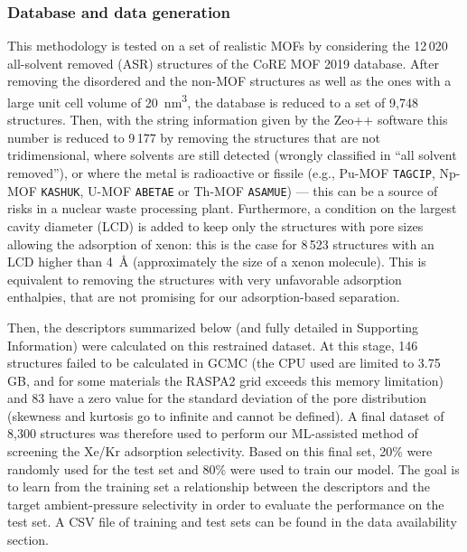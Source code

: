 \documentclass[main]{subfiles}
\begin{document}
\subsubsection{Database and data generation}

This methodology is tested on a set of realistic MOFs by considering the 12\,020 all-solvent removed (ASR) structures of the CoRE MOF 2019 database\autocite{Chung_2019}. After removing the disordered and the non-MOF structures as well as the ones with a large unit cell volume of \SI{20}{\cubic\nano\meter}, the database is reduced to a set of 9,748 structures. Then, with the string information given by the Zeo++ software\autocite{zeopp_Willems2012} this number is reduced to 9\,177 by removing the structures that are not tridimensional, where solvents are still detected (wrongly classified in ``all solvent removed''), or where the metal is radioactive or fissile (e.g., Pu-MOF \texttt{TAGCIP}\autocite{Diwu_2010}, Np-MOF \texttt{KASHUK}\autocite{Martin_2017}, U-MOF \texttt{ABETAE}\autocite{Jouffret_2011} or Th-MOF \texttt{ASAMUE}\autocite{Liang_2016}) --- this can be a source of risks in a nuclear waste processing plant. Furthermore, a condition on the largest cavity diameter (LCD) is added to keep only the structures with pore sizes allowing the adsorption of xenon: this is the case for 8\,523 structures with an LCD higher than \SI{4}{\angstrom} (approximately the size of a xenon molecule). This is equivalent to removing the structures with very unfavorable adsorption enthalpies, that are not promising for our adsorption-based separation.

Then, the descriptors summarized below (and fully detailed in Supporting Information) were calculated on this restrained dataset. At this stage, 146 structures failed to be calculated in GCMC (the CPU used are limited to 3.75 GB, and for some materials the RASPA2 grid exceeds this memory limitation) and 83 have a zero value for the standard deviation of the pore distribution (skewness and kurtosis go to infinite and cannot be defined). A final dataset of 8,300 structures was therefore used to perform our ML-assisted method of screening the Xe/Kr adsorption selectivity. Based on this final set, {20\%} were randomly used for the test set and {80\%} were used to train our model. The goal is to learn from the training set a relationship between the descriptors and the target ambient-pressure selectivity in order to evaluate the performance on the test set. A CSV file of training and test sets can be found in the data availability section.
\end{document}
